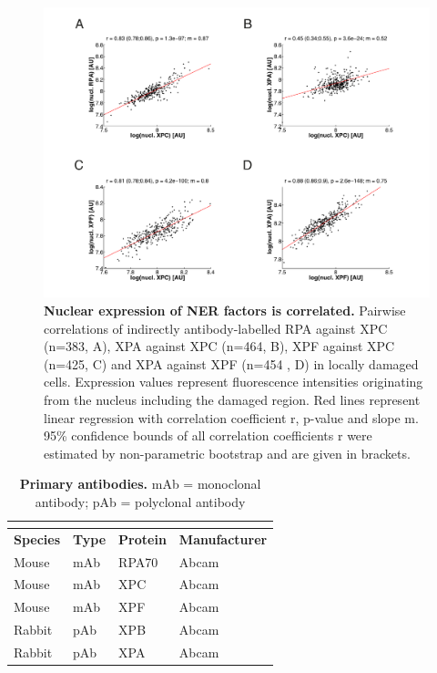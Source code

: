 \begin{figure}[h!]
	\begin{center}
		\includegraphics[width=1\textwidth]{Abbildungen/figure_A_2.pdf}
		\caption{\textbf{Nuclear expression of NER factors is correlated.} Pairwise correlations of indirectly antibody-labelled RPA against XPC (n=383, A), XPA against XPC (n=464, B), XPF against XPC (n=425, C) and XPA against XPF (n=454 , D) in locally damaged cells. Expression values represent fluorescence intensities originating from the nucleus including the damaged region. Red lines represent linear regression with correlation coefficient r, p-value and slope m. 95\% confidence bounds of all correlation coefficients r were estimated by non-parametric bootstrap and are given in brackets. }
		\label{fig:nuklearCrosscorrelation}
	\end{center}
\end{figure}


\begin{table}[H]
	
\begin{center}
	\begin{tabular}{llll}
		
		\multicolumn{4}{l}{} \\
		\hline
		\rule{0pt}{2ex}
		\hspace{-0.15cm}\textbf{Species}    &\textbf{Type} & \textbf{Protein} & \textbf{Manufacturer} \\
		\hline
		
		Mouse & mAb & RPA70 & Abcam       \\
		Mouse & mAb & XPC   & Abcam       \\
		Mouse & mAb & XPF & Abcam       \\
		Rabbit & pAb & XPB & Abcam       \\
		Rabbit & pAb & XPA & Abcam       \\
		\hline
	\end{tabular}
	\caption{\textbf{Primary antibodies.}  mAb = monoclonal antibody; pAb = polyclonal antibody}
	\label{tab:antibodies}
	\end{center}
\end{table}

